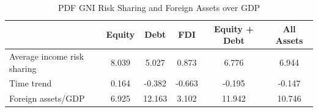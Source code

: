 \begin{table}[!htbp] \centering
\caption{PDF GNI Risk Sharing and Foreign Assets over GDP}
\label{tab:table5_gni_assets}
\begin{tabular}{lccccc}
\hline\hline
 & Equity & Debt & FDI & Equity + Debt & All Assets \\
\hline
Average income risk sharing & 8.039 & 5.027 & 0.873 & 6.776 & 6.944 \\
Time trend & 0.164 & -0.382 & -0.663 & -0.195 & -0.147 \\
Foreign assets/GDP & 6.925 & 12.163 & 3.102 & 11.942 & 10.746 \\
\hline\hline
\end{tabular}
\end{table}
